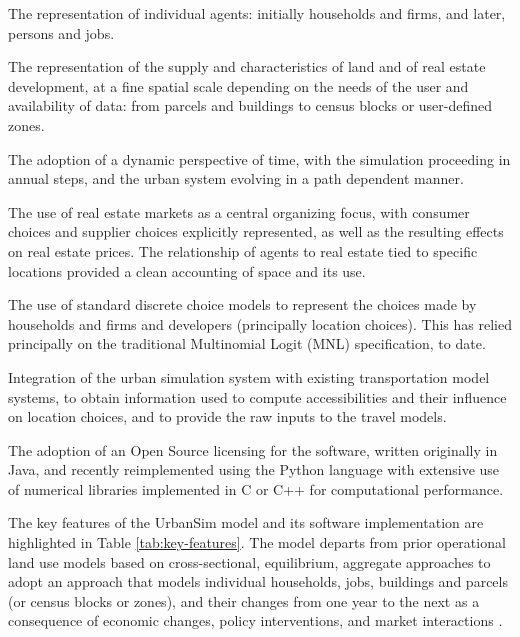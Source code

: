 \squishlist
\item The representation of individual agents: initially households and firms, and later, persons and jobs.
\item The representation of the supply and characteristics of land and of real estate development, at a fine spatial scale depending on the needs of the user and availability of data: from parcels and buildings to census blocks or user-defined zones.
\item   The adoption of a dynamic perspective of time, with the simulation proceeding in annual steps, and the urban system evolving in a path dependent manner.
\item   The use of real estate markets as a central organizing focus, with consumer choices and supplier choices explicitly represented, as well as the resulting effects on real estate prices.  The relationship of agents to real estate tied to specific locations provided a clean accounting of space and its use.
\item   The use of standard discrete choice models to represent the choices made by households and firms and developers (principally location choices).  This has relied principally on the traditional Multinomial Logit (MNL) specification, to date.
\item   Integration of the urban simulation system with existing transportation model systems, to obtain information used to compute accessibilities and their influence on location choices, and to provide the raw inputs to the travel models.
\item   The adoption of an Open Source licensing for the software, written originally in Java, and recently reimplemented using the Python language with extensive use of numerical libraries implemented in C or C++ for computational performance.
\squishend

The key features of the UrbanSim model and its software implementation are highlighted in Table \ref{tab:key-features}.  The model departs from prior operational land use models based on cross-sectional, equilibrium, aggregate approaches to adopt an approach that models individual households, jobs, buildings and parcels (or census blocks or zones), and their changes from one year to the next as a consequence of economic changes, policy interventions, and market interactions .

